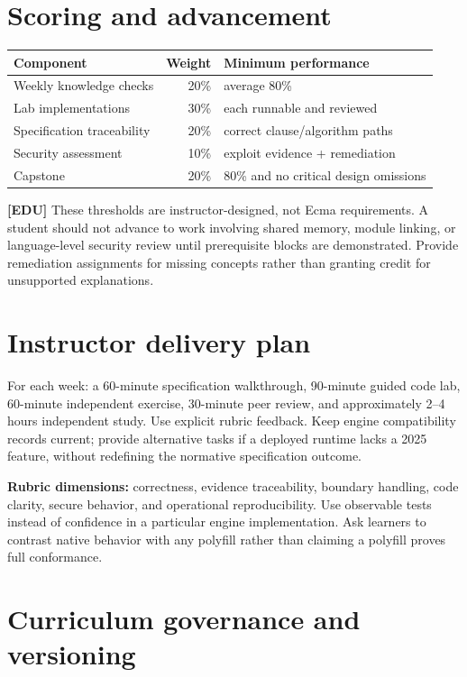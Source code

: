 \documentclass[11pt,letterpaper]{article}
\begin{document}
\section{Scoring and advancement}\label{scoring-and-advancement}

\begin{longtable}[]{@{}lrl@{}}
\toprule\noalign{}
Component & Weight & Minimum performance \\
\midrule\noalign{}
\endhead
\bottomrule\noalign{}
\endlastfoot
Weekly knowledge checks & 20\% & average 80\% \\
Lab implementations & 30\% & each runnable and reviewed \\
Specification traceability & 20\% & correct clause/algorithm paths \\
Security assessment & 10\% & exploit evidence + remediation \\
Capstone & 20\% & 80\% and no critical design omissions \\
\end{longtable}

\textbf{{[}EDU{]}} These thresholds are instructor-designed, not Ecma requirements. A student should not advance to work involving shared memory, module linking, or language-level security review until prerequisite blocks are demonstrated. Provide remediation assignments for missing concepts rather than granting credit for unsupported explanations.

\section{Instructor delivery plan}\label{instructor-delivery-plan}

For each week: a 60-minute specification walkthrough, 90-minute guided code lab, 60-minute independent exercise, 30-minute peer review, and approximately 2--4 hours independent study. Use explicit rubric feedback. Keep engine compatibility records current; provide alternative tasks if a deployed runtime lacks a 2025 feature, without redefining the normative specification outcome.

\textbf{Rubric dimensions:} correctness, evidence traceability, boundary handling, code clarity, secure behavior, and operational reproducibility. Use observable tests instead of confidence in a particular engine implementation. Ask learners to contrast native behavior with any polyfill rather than claiming a polyfill proves full conformance.

\section{Curriculum governance and versioning}\label{curriculum-governance-and-versioning}
\end{document}
